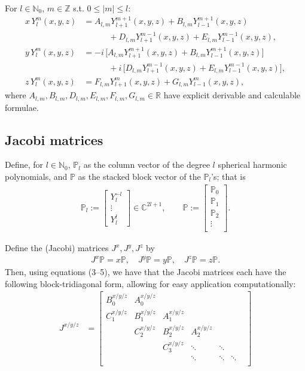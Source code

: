 \documentclass[11pt, oneside]{article}   	%
\newcommand{\R}{\mathbb{R}}
\newcommand{\C}{\mathbb{C}}
\newcommand{\Z}{\mathbb{Z}}
\newcommand{\No}{\mathbb{N}_0}
\newcommand{\Ylm}{Y^m_l}
\newcommand{\Alm}{A_{l,m}}
\newcommand{\Blm}{B_{l,m}}
\newcommand{\Dlm}{D_{l,m}}
\newcommand{\Elm}{E_{l,m}}
\newcommand{\Flm}{F_{l,m}}
\newcommand{\Glm}{G_{l,m}}
\newcommand{\bigP}{\mathbb{P}}
\newcommand{\Pl}{\mathbb{P}_l}
\begin{document}
For \(l \in \No\), \(m \in \Z\) s.t. \(0 \le |m| \le l\):
\begin{align}
x\,\Ylm(x,y,z) &= \Alm Y^{m+1}_{l+1}(x,y,z) +  \Blm Y^{m+1}_{l-1}(x,y,z) \nonumber \\
		     & \quad \quad \quad + \Dlm Y^{m-1}_{l+1}(x,y,z) + \Elm Y^{m-1}_{l-1}(x,y,z), \\
y\,\Ylm(x,y,z) &= - i \, \big[\Alm Y^{m+1}_{l+1}(x,y,z) +  \Blm Y^{m+1}_{l-1}(x,y,z) \big] \nonumber \\
		     &\quad \quad \quad + i \, \big[ \Dlm Y^{m-1}_{l+1}(x,y,z) + \Elm Y^{m-1}_{l-1}(x,y,z) \big], \\
z\,\Ylm(x,y,z) &= \Flm Y^{m}_{l+1}(x,y,z) + \Glm Y^{m}_{l-1}(x,y,z) ,
\end{align}
where \(\Alm, \Blm, \Dlm, \Elm, \Flm, \Glm \in \R\) have explicit derivable and calculable formulae.

\subsection{Jacobi matrices}

Define, for \(l \in \No\), \(\Pl\) as the column vector of the degree \(l\) spherical harmonic polynomials, and \(\bigP\) as the stacked block vector of the \(\Pl\)'s; that is
\begin{align}
\Pl := \begin{bmatrix}
		Y^{-l}_l \\
		\vdots \\
		Y^l_l
	\end{bmatrix} \in \C^{2l+1}, 
\quad \quad 
\bigP := \begin{bmatrix}
		\bigP_0 \\
		\hline
		\bigP_1 \\
		\hline
		\bigP_2 \\
		\vdots \\
	\end{bmatrix}.
\end{align}

Define the (Jacobi) matrices \(J^x, J^y, J^z\) by 
\begin{align}
J^x \bigP = x \bigP, \quad J^y \bigP = y \bigP, \quad J^z \bigP = z \bigP.
\end{align}
Then, using equations (3--5), we have that the Jacobi matrices each have the following block-tridiagonal form, allowing for easy application computationally:
\begin{align}
J^{x/y/z} &= \begin{bmatrix}
		B^{x/y/z}_0 & A^{x/y/z}_0 & & & & \\
		C^{x/y/z}_1 & B^{x/y/z}_1 & A^{x/y/z}_1 & & & \\
		& C^{x/y/z}_2 & B^{x/y/z}_2 & A^{x/y/z}_2  & & & \\
		& & C^{x/y/z}_3 & \ddots & \ddots & \\
		& & & \ddots & \ddots & \ddots \\
	\end{bmatrix}
\end{align}
\end{document}
